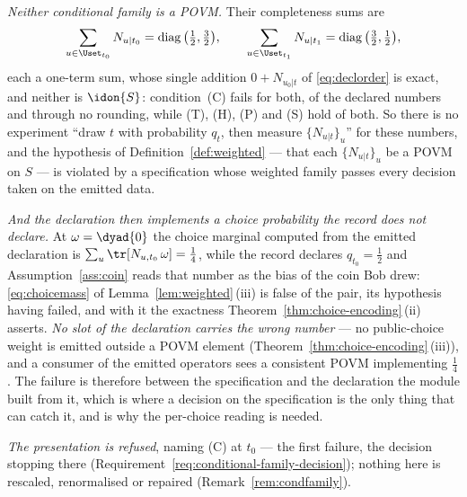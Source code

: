 \begin{example}
\emph{Neither conditional family is a POVM.} Their completeness sums are
\begin{equation*}
  \sum_{u\in\Uset_{t_0}}N_{u|t_0}
    =\operatorname{diag}\big(\tfrac12,\tfrac32\big),\qquad
  \sum_{u\in\Uset_{t_1}}N_{u|t_1}
    =\operatorname{diag}\big(\tfrac32,\tfrac12\big),
\end{equation*}
each a one-term sum, whose single addition $0+N_{u_0|t}$ of
\eqref{eq:declorder} is exact, and neither is $\idon{S}$: condition~(C) fails
for both, of the
declared numbers and through no rounding, while (T), (H), (P) and (S) hold of
both. So there is no experiment ``draw $t$ with probability $q_t$, then measure
$\{N_{u|t}\}_u$'' for these numbers, and the hypothesis of
Definition~\ref{def:weighted} --- that each $\{N_{u|t}\}_u$ be a POVM on $S$
--- is violated by a specification whose weighted family passes every decision
taken on the emitted data.

\emph{And the declaration then implements a choice probability the record does
not declare.} At $\omega=\dyad{0}$ the choice marginal computed from the
emitted declaration is $\sum_{u}\tr[N_{u,t_0}\,\omega]=\tfrac14$, while the
record declares $q_{t_0}=\tfrac12$ and Assumption~\ref{ass:coin} reads that
number as the bias of the coin Bob drew: \eqref{eq:choicemass} of
Lemma~\ref{lem:weighted}\,(iii) is false of the pair, its hypothesis having
failed, and with it the exactness Theorem~\ref{thm:choice-encoding}\,(ii) asserts.
\emph{No slot of the declaration carries the wrong number} --- no
public-choice weight is emitted outside a POVM element
(Theorem~\ref{thm:choice-encoding}\,(iii)), and a consumer of the emitted operators sees a
consistent POVM implementing $\tfrac14$. The failure is therefore between the
specification and the declaration the module built from it, which is where a
decision on the specification is the only thing that can catch it, and is why
the per-choice reading is needed.

\emph{The presentation is refused}, naming (C) at $t_0$ --- the first
failure, the decision stopping there
(Requirement~\ref{req:conditional-family-decision}); nothing here is
rescaled, renormalised or repaired (Remark~\ref{rem:condfamily}).
\end{example}
